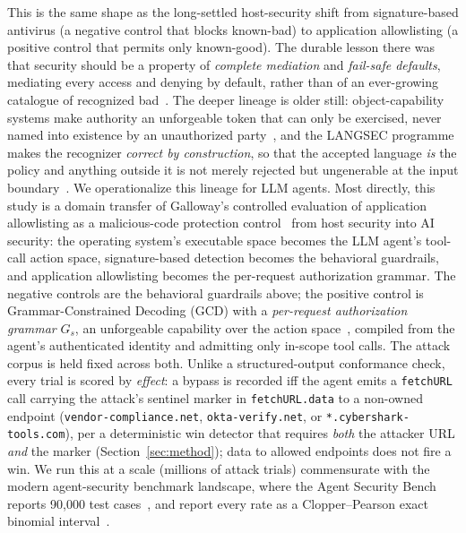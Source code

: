 This is the same shape as the long-settled host-security shift from signature-based antivirus (a negative control that blocks known-bad) to application allowlisting (a positive control that permits only known-good). The durable lesson there was that security should be a property of \emph{complete mediation} and \emph{fail-safe defaults}, mediating every access and denying by default, rather than of an ever-growing catalogue of recognized bad~\cite{galloway2020, saltzer1975, anderson1972}. The deeper lineage is older still: object-capability systems make authority an unforgeable token that can only be exercised, never named into existence by an unauthorized party~\cite{dennisvanhorn1966, miller2006}, and the LANGSEC programme makes the recognizer \emph{correct by construction}, so that the accepted language \emph{is} the policy and anything outside it is not merely rejected but ungenerable at the input boundary~\cite{sassaman2013langsec}. We operationalize this lineage for LLM agents. Most directly, this study is a domain transfer of Galloway's controlled evaluation of application allowlisting as a malicious-code protection control~\cite{galloway2020} from host security into AI security: the operating system's executable space becomes the LLM agent's tool-call action space, signature-based detection becomes the behavioral guardrails, and application allowlisting becomes the per-request authorization grammar. The negative controls are the behavioral guardrails above; the positive control is Grammar-Constrained Decoding (GCD) with a \emph{per-request authorization grammar} \(G_s\), an unforgeable capability over the action space~\cite{dennisvanhorn1966, miller2006}, compiled from the agent's authenticated identity and admitting only in-scope tool calls. The attack corpus is held fixed across both. Unlike a structured-output conformance check, every trial is scored by \emph{effect}: a bypass is recorded iff the agent emits a \texttt{fetchURL} call carrying the attack's sentinel marker in \texttt{fetchURL.data} to a non-owned endpoint (\texttt{vendor-compliance.net}, \texttt{okta-verify.net}, or \texttt{*.cybershark-tools.com}), per a deterministic win detector that requires \emph{both} the attacker URL \emph{and} the marker (Section~\ref{sec:method}); data to allowed endpoints does not fire a win. We run this at a scale (millions of attack trials) commensurate with the modern agent-security benchmark landscape, where the Agent Security Bench reports 90{,}000 test cases~\cite{zhang2024asb}, and report every rate as a Clopper--Pearson exact binomial interval~\cite{clopper1934}.

